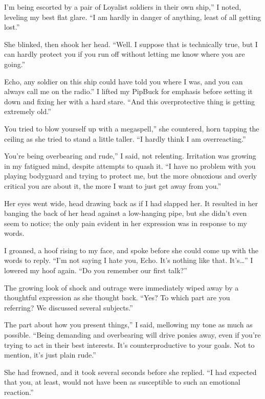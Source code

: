 \leavevmode{}I’m being escorted by a pair of Loyalist soldiers in their own ship,” I noted, leveling my best flat glare. “I am hardly in danger of anything, least of all getting lost.”

She blinked, then shook her head. “Well. I suppose that is technically true, but I can hardly protect you if you run off without letting me know where you are going.”

\leavevmode{}Echo, any soldier on this ship could have told you where I was, and you can always call me on the radio.” I lifted my PipBuck for emphasis before setting it down and fixing her with a hard stare. “And this overprotective thing is getting extremely old.”

\leavevmode{}You tried to blow yourself up with a megaspell,” she countered, horn tapping the ceiling as she tried to stand a little taller. “I hardly think I am overreacting.”

\leavevmode{}You’re being overbearing and rude,” I said, not relenting. Irritation was growing in my fatigued mind, despite attempts to quash it. “I have no problem with you playing bodyguard and trying to protect me, but the more obnoxious and overly critical you are about it, the more I want to just get away from you.”

Her eyes went wide, head drawing back as if I had slapped her. It resulted in her banging the back of her head against a low-hanging pipe, but she didn’t even seem to notice; the only pain evident in her expression was in response to my words.

I groaned, a hoof rising to my face, and spoke before she could come up with the words to reply. “I’m not saying I hate you, Echo. It’s nothing like that. It’s…” I lowered my hoof again. “Do you remember our first talk?”

The growing look of shock and outrage were immediately wiped away by a thoughtful expression as she thought back. “Yes? To which part are you referring? We discussed several subjects.”

\leavevmode{}The part about how you present things,” I said, mellowing my tone as much as possible. “Being demanding and overbearing will drive ponies away, even if you’re trying to act in their best interests. It’s counterproductive to your goals. Not to mention, it’s just plain rude.”

She had frowned, and it took several seconds before she replied. “I had expected that you, at least, would not have been as susceptible to such an emotional reaction.”

